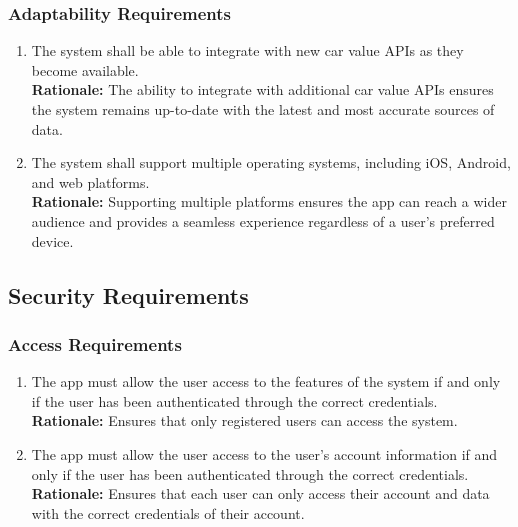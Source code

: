 \documentclass[]{article}
\begin{document}
\subsubsection{Adaptability Requirements}
\label{ssub:adaptability_requirements}
\begin{enumerate}[{MS-A}1. ]
\item The system shall be able to integrate with new car value APIs as they become available.\\
\textbf{Rationale:} The ability to integrate with additional car value APIs ensures the system remains up-to-date with the latest and most accurate sources of data.
\item The system shall support multiple operating systems, including iOS, Android, and web platforms. \\
\textbf{Rationale:} Supporting multiple platforms ensures the app can reach a wider audience and provides a seamless experience regardless of a user's preferred device.
\end{enumerate}

\subsection{Security Requirements}
\label{sub:security_requirements}

\subsubsection{Access Requirements}
\label{ssub:access_requirements}
\begin{enumerate}[{SR-AC}1. ]
\item The app must allow the user access to the features of the system if and only if the user has been authenticated through the correct credentials. \\
\textbf{Rationale:} Ensures that only registered users can access the system.

\item The app must allow the user access to the user's account information if and only if the user has been authenticated through the correct credentials. \\
\textbf{Rationale:} Ensures that each user can only access their account and data with the correct credentials of their account.

\end{enumerate}
\end{document}
